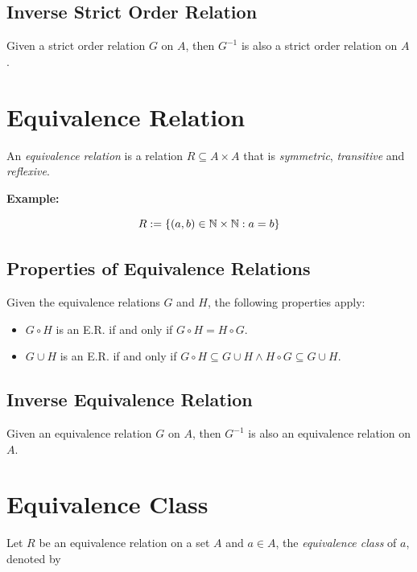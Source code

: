 \subsection{Inverse Strict Order Relation}

Given a strict order relation \(G\) on \(A\), then \(G^{-1}\) is also a strict order relation on \(A\).

\section{Equivalence Relation}

An \emph{equivalence relation} is a relation \(R \subseteq A \times A\) that is \emph{symmetric}, \emph{transitive} and \emph{reflexive}.

\textbf{Example:}

\[
	R:= \{ (a,b) \in \mathbb{N} \times \mathbb{N}: a = b\}
\]

\subsection{Properties of Equivalence Relations}

Given the equivalence relations \(G\) and \(H\), the following properties apply:

\begin{itemize}

	\item \(G \circ H\) is an E.R. if and only if \(G \circ H = H \circ G\).

	\item \(G \cup H\) is an E.R. if and only if  \(G \circ H \subseteq G \cup H \land H \circ G \subseteq G \cup H\).

\end{itemize}

\subsection{Inverse Equivalence Relation}

Given an equivalence relation \(G\) on \(A\), then \(G^{-1}\) is also an equivalence relation on \(A\).

\section{Equivalence Class}

Let \(R\) be an equivalence relation on a set \(A\) and \(a \in A\), the  \emph{equivalence class} of \(a\), denoted by

